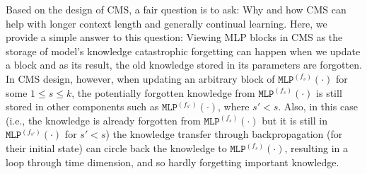 { 
Based on the design of CMS, a fair question is to ask: Why and how CMS can help with longer context length and generally continual learning. Here, we provide a simple answer to this question: Viewing MLP blocks in CMS as the storage of model's knowledge catastrophic forgetting can happen when we update a block and as its result, the old knowledge stored in its parameters are forgotten. In CMS design, however, when updating an arbitrary block of $\texttt{MLP}^{(f_s)}(\cdot)$ for some $1 \leq s \leq k$, the potentially forgotten knowledge from $\texttt{MLP}^{(f_s)}(\cdot)$ is still stored in other components such as $\texttt{MLP}^{(f_{s'})}(\cdot)$, where $s' < s$. Also, in this case (i.e., the knowledge is already forgotten from $\texttt{MLP}^{(f_s)}(\cdot)$ but it is still in $\texttt{MLP}^{(f_{s'})}(\cdot)$ for $s' < s$) the knowledge transfer through backpropagation (for their initial state) can circle back the knowledge to $\texttt{MLP}^{(f_s)}(\cdot)$, resulting in a loop through time dimension, and so hardly forgetting important knowledge.   




}
